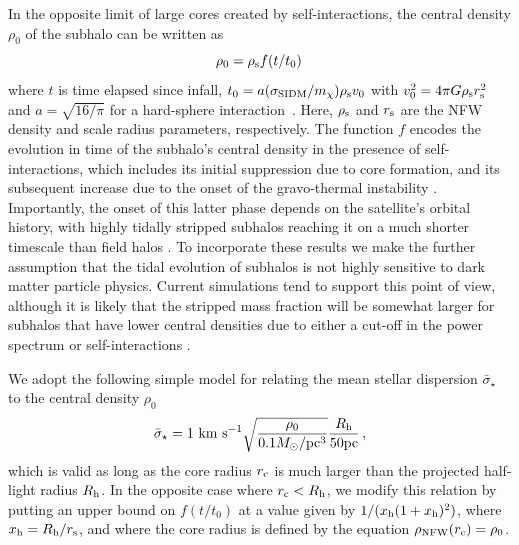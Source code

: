 In the opposite limit of large cores created by self-interactions, the central density $\rho_0$ of the subhalo can be written as \citep{Nishikawa:2019lsc}
\begin{equation}
\rho_0=\rho_{\rm s} f(t/t_0)\,
\end{equation}
where $t$ is time elapsed since infall, $t_0 = a(\sigma_{\rm SIDM}/m_\chi)\rho_{\rm s} v_0$ with $v_0^2=4\pi G \rho_{\rm s} r_{\rm s}^2$ and $a=\sqrt{16/\pi}$ for a hard-sphere interaction~\citep{Balberg:2002ue}. Here, $\rho_{\rm s}$ and $r_{\rm s}$ are the NFW density and scale radius parameters, respectively. The function $f$ encodes the evolution in time of the subhalo's central density in the presence of self-interactions, which includes its initial suppression due to core formation, and its subsequent increase due to the onset of the gravo-thermal instability \citep{Ahn:2004xt}. Importantly, the onset of this latter phase depends on the satellite's orbital history, with highly tidally stripped subhalos reaching it on a much shorter timescale than field halos \citep{Nishikawa:2019lsc}. To incorporate these results we make the further assumption that the tidal evolution of subhalos is not highly sensitive to dark matter particle physics. Current simulations tend to support this point of view, although it is likely that the stripped mass fraction will be somewhat larger for subhalos that have lower central densities due to either a cut-off in the power spectrum or self-interactions \citep{Lovell:2013ola,Dooley:2016ajo}. 

We adopt the following simple model for relating the mean stellar dispersion $\bar{\sigma}_\star$ to the central density $\rho_0$ \citep{Wolf:2009tu}
\begin{equation}
\bar{\sigma}_\star = 1 \mathrm{\,\mathrm{\,km}\,\mathrm{\,s}^{-1}} \sqrt{\frac{\rho_0}{0.1 M_\odot/{\rm pc}^3}} \frac{R_{\rm h}}{50 {\rm pc}}\,,
\end{equation}
which is valid as long as the core radius $r_{\rm c}$ is much larger than the projected half-light radius $R_{\rm h}$. In the opposite case where $r_{\rm c} < R_{\rm h}$, we modify this relation by putting an upper bound on $f(t/t_0)$ at a value given by $1/(x_{\rm h}(1+x_{\rm h})^2)$, where $x_{\rm h} = R_{\rm h}/r_{\rm s}$, and where the core radius is defined by the equation $\rho_{\rm NFW}(r_{\rm c}) = \rho_0$.   

